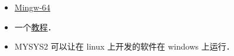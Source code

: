 
\begin{itemize}
\item \href{https://en.wikipedia.org/wiki/Mingw-w64}{Mingw-64}
\item 一个\href{https://www3.ntu.edu.sg/home/ehchua/programming/howto/Cygwin_HowTo.html}{教程}．
\item MYSYS2 可以让在 linux 上开发的软件在 windows 上运行．
\end{itemize}

